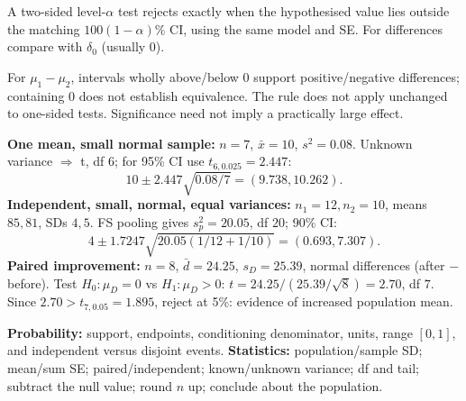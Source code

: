 \documentclass[10pt]{article}
\newcommand{\boxstart}[1]{\begin{tcolorbox}[title={#1},sharp corners]}
\newcommand{\boxend}{\end{tcolorbox}}
\begin{document}
\begin{multicols*}{3}
\boxstart{Ch. 6/7 --- Link confidence intervals to tests}
A two-sided level-$\alpha$ test rejects exactly when the hypothesised value lies outside the matching $100(1-\alpha)\%$ CI, using the same model and SE. For differences compare with $\delta_0$ (usually 0).

For $\mu_1-\mu_2$, intervals wholly above/below 0 support positive/negative differences; containing 0 does not establish equivalence. The rule does not apply unchanged to one-sided tests. Significance need not imply a practically large effect.
\boxend

\boxstart{Ch. 6/7 --- Compact worked decisions}
\textbf{One mean, small normal sample:} $n=7$, $\bar x=10$, $s^2=0.08$. Unknown variance $\Rightarrow$ t, df $6$; for 95\% CI use $t_{6,0.025}=2.447$:
\[
10\pm2.447\sqrt{0.08/7}=(9.738,10.262).
\]
\textbf{Independent, small, normal, equal variances:} $n_1=12,n_2=10$, means $85,81$, SDs $4,5$. FS pooling gives $s_p^2=20.05$, df $20$; 90\% CI:
\[
4\pm1.7247\sqrt{20.05(1/12+1/10)}=(0.693,7.307).
\]
\textbf{Paired improvement:} $n=8$, $\bar d=24.25$, $s_D=25.39$, normal differences (after $-$ before). Test $H_0:\mu_D=0$ vs $H_1:\mu_D>0$: $t=24.25/(25.39/\sqrt8)=2.70$, df $7$. Since $2.70>t_{7,0.05}=1.895$, reject at 5\%: evidence of increased population mean.
\boxend

\boxstart{All chapters --- Final answer checks}
\textbf{Probability:} support, endpoints, conditioning denominator, units, range $[0,1]$, and independent versus disjoint events.
\textbf{Statistics:} population/sample SD; mean/sum SE; paired/independent; known/unknown variance; df and tail; subtract the null value; round $n$ up; conclude about the population.
\boxend
\end{multicols*}
\end{document}
